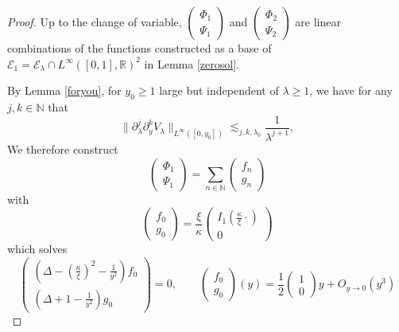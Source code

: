 \documentclass[11 pt]{amsart}
\theoremstyle{definition}
\theoremstyle{remark}
\numberwithin{equation}{section}
\begin{document}
\begin{proof}
  Up to the change of variable, $\left(\begin{array}{c}
    \Phi_1\\
    \Psi_1
  \end{array}\right)$ and $\left(\begin{array}{c}
    \Phi_2\\
    \Psi_2
  \end{array}\right)$ are linear combinations of the functions constructed as
  a base of $\mathcal{E}_1 =\mathcal{E}_{\lambda} \cap L^{\infty} ([0, 1],
  \mathbb{R})^2$ in Lemma \ref{zerosol}.
  
  By Lemma \ref{foryou}, for $y_0 \geqslant 1$ large but independent of
  $\lambda \geqslant 1$, we have for any $j,k \in \mathbb{N}$ that
  \[ \| \partial_{\lambda}^j\partial_y^k V_{\lambda} \|_{L^{\infty} ([0, y_0])} \lesssim_{j,k,\lambda_0} \frac{1}{\lambda^{j + 1}}, \]
  We therefore construct
  \[ \left(\begin{array}{c}
       \Phi_1\\
       \Psi_1
     \end{array}\right) = \sum_{n \in \mathbb{N}} \left(\begin{array}{c}
       f_n\\
       g_n
     \end{array}\right) \]
  with
  \[ \left(\begin{array}{c}
       f_0\\
       g_0
     \end{array}\right) = \frac{\xi}{\kappa}
     \left(\begin{array}{c}
       I_1 \left( \frac{\kappa}{\xi} \cdot \right)\\
       0
     \end{array}\right) \]
  which solves
  \[ \left(\begin{array}{c}
       \left( \Delta - \left( \frac{\kappa}{\xi} \right)^2 -
       \frac{1}{y^2} \right) f_0\\
       \left( \Delta + 1 - \frac{1}{y^2} \right) g_0
     \end{array}\right) = 0, \qquad \left(\begin{array}{c}
       f_0\\
       g_0
     \end{array}\right) (y) = \frac{1}{2}\left(\begin{array}{c}
       1\\
       0
     \end{array}\right) y + O_{y \rightarrow 0} (y^3) \]

\end{proof}
\end{document}
